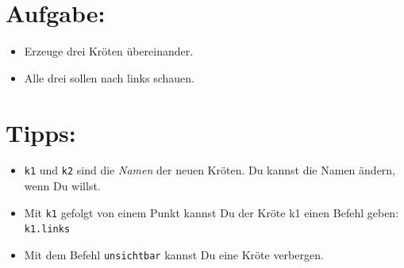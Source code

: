 \section*{\color{BrickRed}Aufgabe:}


\begin{itemize}

\item {Erzeuge drei Kröten übereinander.}
\item {Alle drei sollen nach links schauen.}

\end{itemize}


\section*{\color{OliveGreen}Tipps:}


\begin{itemize}

\item {\lstinline{k1} und \lstinline{k2} sind die {\it Namen} der neuen Kröten. Du kannst die Namen ändern, wenn Du willst.}
\item {Mit \lstinline{k1} gefolgt von einem Punkt kannst Du der Kröte k1 einen Befehl geben: \lstinline{k1.links}}
\item {Mit dem Befehl \lstinline{unsichtbar} kannst Du eine Kröte verbergen.}

\end{itemize}


